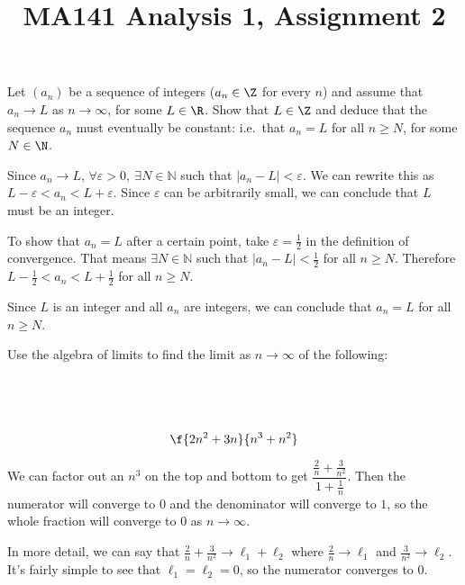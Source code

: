 \documentclass[a4paper]{article}
\title{MA141 Analysis 1, Assignment 2}
\begin{document}
\maketitle

\setlength{\parindent}{0em}
\setlength{\parskip}{1em}


\begin{questionbody}
Let $(a_n)$ be a sequence of integers ($a_n \in \Z$ for every $n$) and assume that $a_n \to L$ as $n \to \infty$, for some $L \in \R$. Show that $L \in \Z$ and deduce that the sequence $a_n$ must eventually be constant: i.e.\ that $a_n = L$ for all $n \ge N$, for some $N \in \N$.
\end{questionbody}

Since $a_n \to L$, $\forall \varepsilon > 0,\ \exists N \in \mathbb N$ such that $|a_n - L| < \varepsilon$. We can rewrite this as $L - \varepsilon < a_n < L + \varepsilon$. Since $\varepsilon$ can be arbitrarily small, we can conclude that $L$ must be an integer.

To show that $a_n = L$ after a certain point, take $\varepsilon = \frac12$ in the definition of convergence. That means $\exists N \in \mathbb N$ such that $|a_n - L| < \frac12$ for all $n \ge N$. Therefore $L - \frac12 < a_n < L + \frac12$ for all $n \ge N$.

Since $L$ is an integer and all $a_n$ are integers, we can conclude that $a_n = L$ for all $n \ge N$.


\begin{questionbody}
Use the algebra of limits to find the limit as $n \to \infty$ of the following:
\end{questionbody}

\subsection{~} %

\begin{questionbody}
\[ \f{2n^2 + 3n}{n^3 + n^2} \]
\end{questionbody}

We can factor out an $n^3$ on the top and bottom to get $\dfrac{\frac{2}{n} + \frac{3}{n^2}}{1 + \frac{1}{n}}$. Then the numerator will converge to $0$ and the denominator will converge to $1$, so the whole fraction will converge to $0$ as $n \to \infty$.

In more detail, we can say that $\frac2n + \frac3{n^2} \to \ell_1 + \ell_2$ where $\frac2n \to \ell_1$ and $\frac3{n^2} \to \ell_2$. It's fairly simple to see that $\ell_1 = \ell_2 = 0$, so the numerator converges to $0$.
\end{document}
